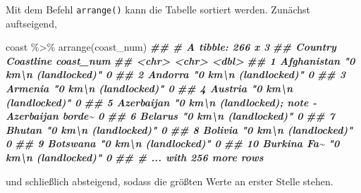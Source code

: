 \documentclass[11pt,german,a4paper]{article}
\newenvironment{Shaded}{\begin{snugshade}}{\end{snugshade}}
\newcommand{\DocumentationTok}[1]{\textcolor[rgb]{0.56,0.35,0.01}{\textbf{\textit{#1}}}}
\newcommand{\FunctionTok}[1]{\textcolor[rgb]{0.00,0.00,0.00}{#1}}
\newcommand{\NormalTok}[1]{#1}
\newcommand{\SpecialCharTok}[1]{\textcolor[rgb]{0.00,0.00,0.00}{#1}}
\begin{document}
Mit dem Befehl \texttt{arrange()} kann die Tabelle sortiert werden. Zunächst auftseigend,

\begin{Shaded}
\begin{Highlighting}[]
\NormalTok{coast }\SpecialCharTok{\%\textgreater{}\%}
  \FunctionTok{arrange}\NormalTok{(coast\_num)}
\DocumentationTok{\#\# \# A tibble: 266 x 3}
\DocumentationTok{\#\#    Country     Coastline                                               coast\_num}
\DocumentationTok{\#\#    \textless{}chr\textgreater{}       \textless{}chr\textgreater{}                                                       \textless{}dbl\textgreater{}}
\DocumentationTok{\#\#  1 Afghanistan "0 km\textbackslash{}n          (landlocked)"                                  0}
\DocumentationTok{\#\#  2 Andorra     "0 km\textbackslash{}n          (landlocked)"                                  0}
\DocumentationTok{\#\#  3 Armenia     "0 km\textbackslash{}n          (landlocked)"                                  0}
\DocumentationTok{\#\#  4 Austria     "0 km\textbackslash{}n          (landlocked)"                                  0}
\DocumentationTok{\#\#  5 Azerbaijan  "0 km\textbackslash{}n          (landlocked); note {-} Azerbaijan borde\textasciitilde{}         0}
\DocumentationTok{\#\#  6 Belarus     "0 km\textbackslash{}n          (landlocked)"                                  0}
\DocumentationTok{\#\#  7 Bhutan      "0 km\textbackslash{}n          (landlocked)"                                  0}
\DocumentationTok{\#\#  8 Bolivia     "0 km\textbackslash{}n          (landlocked)"                                  0}
\DocumentationTok{\#\#  9 Botswana    "0 km\textbackslash{}n          (landlocked)"                                  0}
\DocumentationTok{\#\# 10 Burkina Fa\textasciitilde{} "0 km\textbackslash{}n          (landlocked)"                                  0}
\DocumentationTok{\#\# \# ... with 256 more rows}
\end{Highlighting}
\end{Shaded}

und schließlich absteigend, sodass die größten Werte an erster Stelle stehen.
\end{document}
